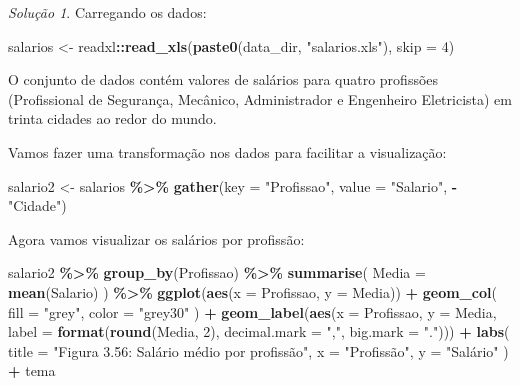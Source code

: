 \documentclass[
]{latex/krantz}
\newenvironment{Shaded}{\begin{snugshade}}{\end{snugshade}}
\newcommand{\AttributeTok}[1]{\textcolor[rgb]{0.13,0.29,0.53}{#1}}
\newcommand{\DecValTok}[1]{\textcolor[rgb]{0.00,0.00,0.81}{#1}}
\newcommand{\FunctionTok}[1]{\textcolor[rgb]{0.13,0.29,0.53}{\textbf{#1}}}
\newcommand{\NormalTok}[1]{#1}
\newcommand{\OtherTok}[1]{\textcolor[rgb]{0.56,0.35,0.01}{#1}}
\newcommand{\SpecialCharTok}[1]{\textcolor[rgb]{0.81,0.36,0.00}{\textbf{#1}}}
\newcommand{\StringTok}[1]{\textcolor[rgb]{0.31,0.60,0.02}{#1}}
\theoremstyle{definition}
\theoremstyle{definition}
\theoremstyle{definition}
\theoremstyle{definition}
\theoremstyle{remark}
\newtheorem*{solution}{Solução}
\begin{document}
\begin{solution}
Carregando os dados:

\begin{Shaded}
\begin{Highlighting}[]
\NormalTok{salarios }\OtherTok{\textless{}{-}}\NormalTok{ readxl}\SpecialCharTok{::}\FunctionTok{read\_xls}\NormalTok{(}\FunctionTok{paste0}\NormalTok{(data\_dir, }\StringTok{"salarios.xls"}\NormalTok{), }\AttributeTok{skip =} \DecValTok{4}\NormalTok{)}
\end{Highlighting}
\end{Shaded}

O conjunto de dados contém valores de salários para quatro profissões (Profissional de Segurança, Mecânico, Administrador e Engenheiro Eletricista) em trinta cidades ao redor do mundo.

Vamos fazer uma transformação nos dados para facilitar a visualização:

\begin{Shaded}
\begin{Highlighting}[]
\NormalTok{salario2 }\OtherTok{\textless{}{-}}\NormalTok{ salarios }\SpecialCharTok{\%\textgreater{}\%}
              \FunctionTok{gather}\NormalTok{(}\AttributeTok{key =} \StringTok{"Profissao"}\NormalTok{, }\AttributeTok{value =} \StringTok{"Salario"}\NormalTok{, }\SpecialCharTok{{-}}\StringTok{"Cidade"}\NormalTok{)}
\end{Highlighting}
\end{Shaded}

Agora vamos visualizar os salários por profissão:

\begin{Shaded}
\begin{Highlighting}[]
\NormalTok{salario2 }\SpecialCharTok{\%\textgreater{}\%}
  \FunctionTok{group\_by}\NormalTok{(Profissao) }\SpecialCharTok{\%\textgreater{}\%}
  \FunctionTok{summarise}\NormalTok{(}
    \AttributeTok{Media =} \FunctionTok{mean}\NormalTok{(Salario)}
\NormalTok{  ) }\SpecialCharTok{\%\textgreater{}\%}
  \FunctionTok{ggplot}\NormalTok{(}\FunctionTok{aes}\NormalTok{(}\AttributeTok{x =}\NormalTok{ Profissao, }\AttributeTok{y =}\NormalTok{ Media)) }\SpecialCharTok{+}
    \FunctionTok{geom\_col}\NormalTok{(}
      \AttributeTok{fill =} \StringTok{"grey"}\NormalTok{, }
      \AttributeTok{color =} \StringTok{"grey30"}
\NormalTok{    ) }\SpecialCharTok{+}
    \FunctionTok{geom\_label}\NormalTok{(}\FunctionTok{aes}\NormalTok{(}\AttributeTok{x =}\NormalTok{ Profissao, }\AttributeTok{y =}\NormalTok{ Media, }\AttributeTok{label =} \FunctionTok{format}\NormalTok{(}\FunctionTok{round}\NormalTok{(Media, }\DecValTok{2}\NormalTok{), }\AttributeTok{decimal.mark =} \StringTok{","}\NormalTok{, }\AttributeTok{big.mark =} \StringTok{"."}\NormalTok{))) }\SpecialCharTok{+}
    \FunctionTok{labs}\NormalTok{(}
      \AttributeTok{title =} \StringTok{"Figura 3.56: Salário médio por profissão"}\NormalTok{,}
      \AttributeTok{x =} \StringTok{"Profissão"}\NormalTok{,}
      \AttributeTok{y =} \StringTok{"Salário"}
\NormalTok{    ) }\SpecialCharTok{+}
\NormalTok{    tema}
\end{Highlighting}
\end{Shaded}


\end{solution}
\end{document}
